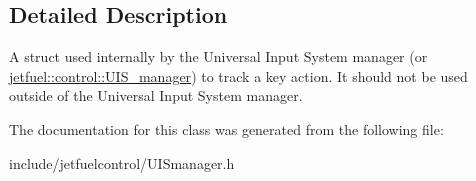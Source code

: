 \subsection{Detailed Description}
A struct used internally by the Universal Input System manager (or \hyperlink{classjetfuel_1_1control_1_1UIS__manager}{jetfuel\+::control\+::\+U\+I\+S\+\_\+manager}) to track a key action. It should not be used outside of the Universal Input System manager. 

The documentation for this class was generated from the following file\+:\begin{DoxyCompactItemize}
\item 
include/jetfuelcontrol/U\+I\+Smanager.\+h\end{DoxyCompactItemize}
